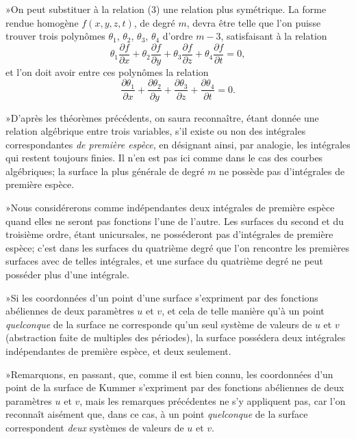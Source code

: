 \documentclass{article}
\begin{document}
»On peut substituer à la relation (3) une relation plus symétrique. La forme rendue homogène $f(x, y, z, t)$, de degré $m$, devra être telle que l'on puisse trouver trois polynômes $\theta_{1}$, $\theta_{2}$, $\theta_{3}$, $\theta_{4}$ d'ordre $m - 3$, satisfaisant à la relation
\[
\theta_{1} \frac{\partial f}{\partial x} + \theta_{2} \frac{\partial f}{\partial y} + \theta_{3} \frac{\partial f}{\partial z} + \theta_{4} \frac{\partial f}{\partial t} = 0,
\]
et l'on doit avoir entre ces polynômes la relation
\[
\frac{\partial \theta_{1}}{\partial x} + \frac{\partial \theta_{2}}{\partial y} + \frac{\partial \theta_{3}}{\partial z} + \frac{\partial \theta_{4}}{\partial t} = 0.
\]

»D'après les théorèmes précédents, on saura reconnaître, étant donnée une relation algébrique entre trois variables, s'il existe ou non des intégrales correspondantes \emph{de première espèce}, en désignant ainsi, par analogie, les intégrales qui restent toujours finies. Il n'en est pas ici comme dans le cas des courbes algébriques; la surface la plus générale de degré $m$ ne possède pas d'intégrales de première espèce.

»Nous considérerons comme indépendantes deux intégrales de première espèce quand elles ne seront pas fonctions l'une de l'autre. Les surfaces du second et du troisième ordre, étant unicursales, ne posséderont pas d'intégrales de première espèce; c'est dans les surfaces du quatrième degré que l'on rencontre les premières surfaces avec de telles intégrales, et une surface du quatrième degré ne peut posséder plus d'une intégrale.

»Si les coordonnées d'un point d'une surface s'expriment par des fonctions
abéliennes de deux paramètres $u$ et $v$, et cela de telle manière qu'à un point \emph{quelconque} de la surface ne corresponde qu'un seul système de valeurs de $u$ et $v$ (abstraction faite de multiples des périodes), la surface possédera deux intégrales indépendantes de première espèce, et deux seulement.

»Remarquons, en passant, que, comme il est bien connu, les coordonnées d'un point de la surface de Kummer s'expriment par des fonctions abéliennes de deux paramètres $u$ et $v$, mais les remarques précédentes ne s'y appliquent pas, car l'on reconnaît aisément que, dans ce cas, à un point \emph{quelconque} de la surface correspondent \emph{deux} systèmes de valeurs de $u$ et $v$.
\end{document}
